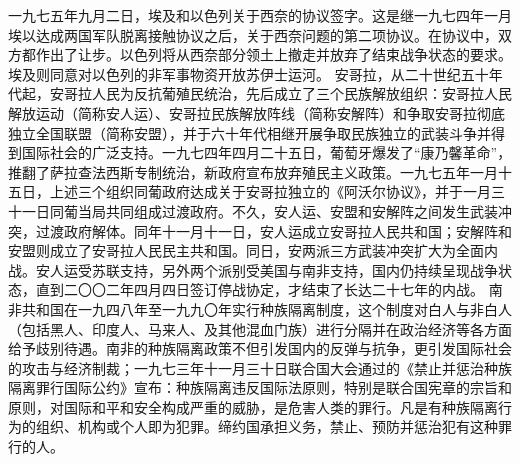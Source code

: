 \begin{maonote}
一九七五年九月二日，埃及和以色列关于西奈的协议签字。这是继一九七四年一月埃以达成两国军队脱离接触协议之后，关于西奈问题的第二项协议。在协议中，双方都作出了让步。以色列将从西奈部分领土上撤走并放弃了结束战争状态的要求。埃及则同意对以色列的非军事物资开放苏伊士运河。
安哥拉，从二十世纪五十年代起，安哥拉人民为反抗葡殖民统治，先后成立了三个民族解放组织：安哥拉人民解放运动（简称安人运）、安哥拉民族解放阵线（简称安解阵）和争取安哥拉彻底独立全国联盟（简称安盟），并于六十年代相继开展争取民族独立的武装斗争并得到国际社会的广泛支持。一九七四年四月二十五日，葡萄牙爆发了“康乃馨革命”，推翻了萨拉查法西斯专制统治，新政府宣布放弃殖民主义政策。一九七五年一月十五日，上述三个组织同葡政府达成关于安哥拉独立的《阿沃尔协议》，并于一月三十一日同葡当局共同组成过渡政府。不久，安人运、安盟和安解阵之间发生武装冲突，过渡政府解体。同年十一月十一日，安人运成立安哥拉人民共和国；安解阵和安盟则成立了安哥拉人民民主共和国。同日，安两派三方武装冲突扩大为全面内战。安人运受苏联支持，另外两个派别受美国与南非支持，国内仍持续呈现战争状态，直到二〇〇二年四月四日签订停战协定，才结束了长达二十七年的内战。
南非共和国在一九四八年至一九九〇年实行种族隔离制度，这个制度对白人与非白人（包括黑人、印度人、马来人、及其他混血门族）进行分隔并在政治经济等各方面给予歧别待遇。南非的种族隔离政策不但引发国内的反弹与抗争，更引发国际社会的攻击与经济制裁；一九七三年十一月三十日联合国大会通过的《禁止并惩治种族隔离罪行国际公约》宣布：种族隔离违反国际法原则，特别是联合国宪章的宗旨和原则，对国际和平和安全构成严重的威胁，是危害人类的罪行。凡是有种族隔离行为的组织、机构或个人即为犯罪。缔约国承担义务，禁止、预防并惩治犯有这种罪行的人。
\end{maonote}
